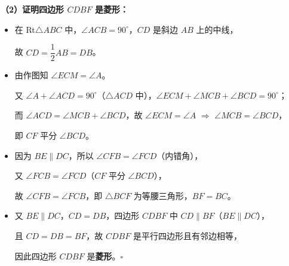 \documentclass[12pt, a4paper]{ctexrep}
\begin{document}
\begin{center}
\end{center}

\vspace{0.3cm}
\textbf{（2）证明四边形 $CDBF$ 是菱形：}

\begin{itemize}
    \item 在 Rt$\triangle ABC$ 中，$\angle ACB = 90^\circ$，$CD$ 是斜边 $AB$ 上的中线，

    故 $CD = \dfrac{1}{2}AB = DB$。

    \item 由作图知 $\angle ECM = \angle A$。

    又 $\angle A + \angle ACD = 90^\circ$（$\triangle ACD$ 中），$\angle ECM + \angle MCB + \angle BCD = 90^\circ$；

    而 $\angle ACD = \angle MCB + \angle BCD$，故 $\angle ECM = \angle A$ $\Rightarrow$ $\angle MCB = \angle BCD$，

    即 $CF$ 平分 $\angle BCD$。

    \item 因为 $BE \parallel DC$，所以 $\angle CFB = \angle FCD$（内错角），

    又 $\angle FCB = \angle FCD$（$CF$ 平分 $\angle BCD$），

    故 $\angle CFB = \angle FCB$，即 $\triangle BCF$ 为等腰三角形，$BF = BC$。

    \item 又 $BE \parallel DC$，$CD = DB$，四边形 $CDBF$ 中 $CD \parallel BF$（$BE \parallel DC$），

    且 $CD = DB = BF$，故 $CDBF$ 是平行四边形且有邻边相等，

    因此四边形 $CDBF$ 是\textbf{菱形}。$\square$
\end{itemize}
\end{document}

